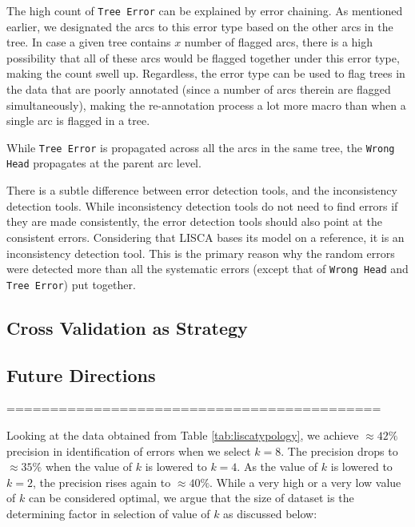 The high count of \texttt{Tree Error} can be explained by error chaining. As mentioned earlier, we designated the arcs to this error type based on the other arcs in the tree. In case a given tree contains \(x\) number of flagged arcs, there is a high possibility that all of these arcs would be flagged together under this error type, making the count swell up. Regardless, the error type can be used to flag trees in the data that are poorly annotated (since a number of arcs therein are flagged simultaneously), making the re-annotation process a lot more macro than when a single arc is flagged in a tree.

While \texttt{Tree Error} is propagated across all the arcs in the same tree, the \texttt{Wrong Head} propagates at the parent arc level. 

There is a subtle difference between error detection tools, and the inconsistency detection tools. While inconsistency detection tools do not need to find errors if they are made consistently, the error detection tools should also point at the consistent errors. Considering that LISCA bases its model on a reference, it is an inconsistency detection tool. This is the primary reason why the random errors were detected more than all the systematic errors (except that of \texttt{Wrong Head} and \texttt{Tree Error}) put together.

\subsection{Cross Validation as Strategy}

\subsection{Future Directions}

===========================================

Looking at the data obtained from Table \ref{tab:liscatypology}, we achieve \(\approx 42 \%\) precision in identification of errors when we select \(k=8\). The precision drops to \(\approx 35 \%\) when the value of \(k\) is lowered to \(k=4\). As the value of \(k\) is lowered to \(k=2\), the precision rises again to \(\approx 40 \%\). While a very high or a very low value of \(k\) can be considered optimal, we argue that the size of dataset is the determining factor in selection of value of \(k\) as discussed below:

